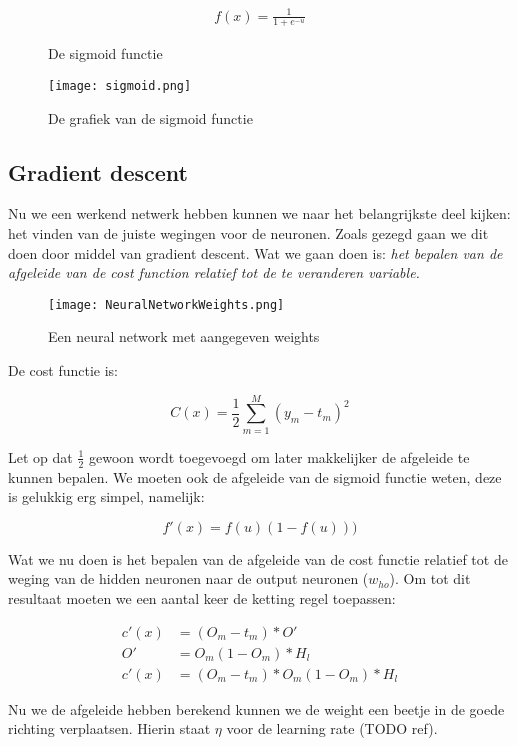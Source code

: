 \begin{figure}[H]
	\begin{align*}
	   f(x) = \frac{1}{1 + e^{-u}}
	\end{align*}
	\caption{De sigmoid functie}
\end{figure}

\begin{figure}[H]
  \centering
    \texttt{[image: sigmoid.png]}
  \caption{De grafiek van de sigmoid functie}
  \label{fig:sigmoid-function}
\end{figure}


\subsection{Gradient descent}
Nu we een werkend netwerk hebben kunnen we naar het belangrijkste deel kijken: het vinden van de juiste wegingen voor de neuronen. Zoals gezegd gaan we dit doen door middel van gradient descent.
Wat we gaan doen is: \textit{het bepalen van de afgeleide van de cost function relatief tot de te veranderen variable.}

\begin{figure}[H]
  \centering
    \texttt{[image: NeuralNetworkWeights.png]}
  \caption{Een neural network met aangegeven weights}
  \label{fig:NeuralNetworkWeights}
\end{figure}

De cost functie is:

$$ C(x) = \frac{1}{2}\sum_{m=1}^{M}(y_{m}-t_{m})^2 $$

Let op dat $\frac{1}{2}$ gewoon wordt toegevoegd om later makkelijker de afgeleide te kunnen bepalen. We moeten ook de afgeleide van de sigmoid functie weten, deze is gelukkig erg simpel, namelijk:

$$ f'(x) = f(u)(1-f(u))) $$

Wat we nu doen is het bepalen van de afgeleide van de cost functie relatief tot de weging van de hidden neuronen naar de output neuronen ($w_{ho}$). Om tot dit resultaat moeten we een aantal keer de ketting regel toepassen:

\begin{align*}
	c'(x) &= (O_{m}-t_{m}) * O' \\
	O' &= O_{m}(1-O_{m}) * H_{l} \\
	c'(x) &= (O_{m}-t_{m}) * O_{m}(1-O_{m})*H_{l}
\end{align*}

Nu we de afgeleide hebben berekend kunnen we de weight een beetje in de goede richting verplaatsen. Hierin staat $\eta$ voor de learning rate (TODO ref).

